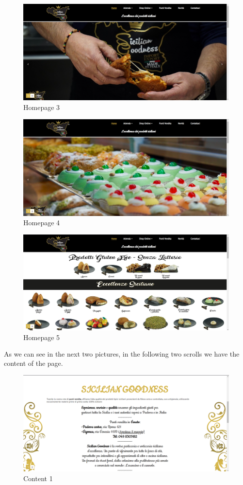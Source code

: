 \begin{figure}[H]
	\centering\includegraphics[width=12cm]{Img/hom3.png}
	\caption{Homepage 3}
\end{figure}

\begin{figure}[H]
	\centering\includegraphics[width=12cm]{Img/hom4.png}
	\caption{Homepage 4}
\end{figure}

\begin{figure}[H]
	\label{hom5}
	\centering\includegraphics[width=12cm]{Img/hom5.png}
	\caption{Homepage 5}
\end{figure}

\pagebreak

As we can see in the next two pictures, in the following two scrolls we have the content of the page.

\begin{figure}[H]
	\centering\includegraphics[width=12cm]{Img/content1.png}
	\caption{Content 1}
\end{figure}

